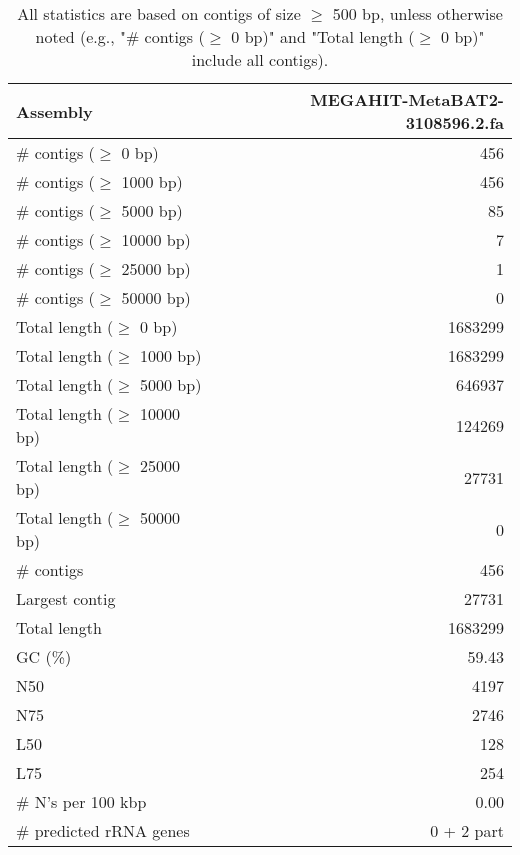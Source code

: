 \documentclass[12pt,a4paper]{article}
\begin{document}
\begin{table}[ht]
\begin{center}
\caption{All statistics are based on contigs of size $\geq$ 500 bp, unless otherwise noted (e.g., "\# contigs ($\geq$ 0 bp)" and "Total length ($\geq$ 0 bp)" include all contigs).}
\begin{tabular}{|l*{1}{|r}|}
\hline
Assembly & MEGAHIT-MetaBAT2-3108596.2.fa \\ \hline
\# contigs ($\geq$ 0 bp) & 456 \\ \hline
\# contigs ($\geq$ 1000 bp) & 456 \\ \hline
\# contigs ($\geq$ 5000 bp) & 85 \\ \hline
\# contigs ($\geq$ 10000 bp) & 7 \\ \hline
\# contigs ($\geq$ 25000 bp) & 1 \\ \hline
\# contigs ($\geq$ 50000 bp) & 0 \\ \hline
Total length ($\geq$ 0 bp) & 1683299 \\ \hline
Total length ($\geq$ 1000 bp) & 1683299 \\ \hline
Total length ($\geq$ 5000 bp) & 646937 \\ \hline
Total length ($\geq$ 10000 bp) & 124269 \\ \hline
Total length ($\geq$ 25000 bp) & 27731 \\ \hline
Total length ($\geq$ 50000 bp) & 0 \\ \hline
\# contigs & 456 \\ \hline
Largest contig & 27731 \\ \hline
Total length & 1683299 \\ \hline
GC (\%) & 59.43 \\ \hline
N50 & 4197 \\ \hline
N75 & 2746 \\ \hline
L50 & 128 \\ \hline
L75 & 254 \\ \hline
\# N's per 100 kbp & 0.00 \\ \hline
\# predicted rRNA genes & 0 + 2 part \\ \hline
\end{tabular}
\end{center}
\end{table}
\end{document}

